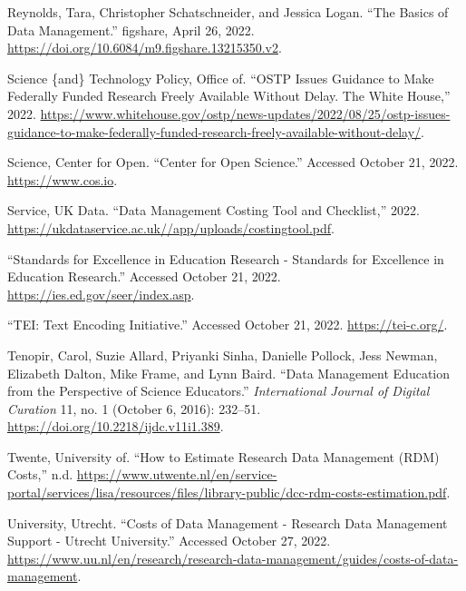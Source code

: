 \documentclass[
]{book}
\newlength{\cslhangindent}
\newlength{\cslentryspacingunit} %
\newenvironment{CSLReferences}[2] %
 {%
  \setlength{\parindent}{0pt}
  \ifodd #1
  \let\oldpar\par
  \def\par{\hangindent=\cslhangindent\oldpar}
  \fi
  \setlength{\parskip}{#2\cslentryspacingunit}
 }%
 {}
\begin{document}
\begin{CSLReferences}{1}{0}
\leavevmode{}%
Reynolds, Tara, Christopher Schatschneider, and Jessica Logan. {``The Basics of Data Management.''} figshare, April 26, 2022. \url{https://doi.org/10.6084/m9.figshare.13215350.v2}.

\leavevmode{}%
Science \{and\} Technology Policy, Office of. {``{OSTP} Issues Guidance to Make Federally Funded Research Freely Available Without Delay. The White House,''} 2022. \url{https://www.whitehouse.gov/ostp/news-updates/2022/08/25/ostp-issues-guidance-to-make-federally-funded-research-freely-available-without-delay/}.

\leavevmode{}%
Science, Center for Open. {``Center for Open Science.''} Accessed October 21, 2022. \url{https://www.cos.io}.

\leavevmode{}%
Service, UK Data. {``Data Management Costing Tool and Checklist,''} 2022. \url{https://ukdataservice.ac.uk//app/uploads/costingtool.pdf}.

\leavevmode{}%
{``Standards for Excellence in Education Research - Standards for Excellence in Education Research.''} Accessed October 21, 2022. \url{https://ies.ed.gov/seer/index.asp}.

\leavevmode{}%
{``{TEI}: Text Encoding Initiative.''} Accessed October 21, 2022. \url{https://tei-c.org/}.

\leavevmode{}%
Tenopir, Carol, Suzie Allard, Priyanki Sinha, Danielle Pollock, Jess Newman, Elizabeth Dalton, Mike Frame, and Lynn Baird. {``Data Management Education from the Perspective of Science Educators.''} \emph{International Journal of Digital Curation} 11, no. 1 (October 6, 2016): 232--51. \url{https://doi.org/10.2218/ijdc.v11i1.389}.

\leavevmode{}%
Twente, University of. {``How to Estimate Research Data Management ({RDM}) Costs,''} n.d. \url{https://www.utwente.nl/en/service-portal/services/lisa/resources/files/library-public/dcc-rdm-costs-estimation.pdf}.

\leavevmode{}%
University, Utrecht. {``Costs of Data Management - Research Data Management Support - Utrecht University.''} Accessed October 27, 2022. \url{https://www.uu.nl/en/research/research-data-management/guides/costs-of-data-management}.


\end{CSLReferences}
\end{document}
